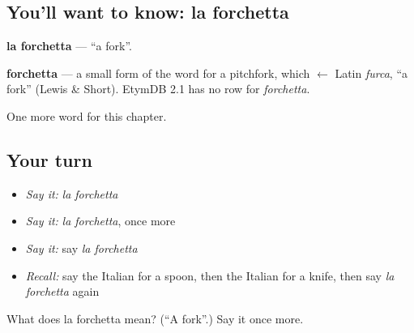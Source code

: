 \subsection*{You'll want to know: la forchetta}
\textbf{la forchetta} — \textquotedblleft{}a fork\textquotedblright{}.

\begin{cousinweb}
\textbf{forchetta} — a small form of the word for a pitchfork, which $\leftarrow$ Latin \emph{furca}, \textquotedblleft{}a fork\textquotedblright{} (Lewis \& Short). EtymDB 2.1 has no row for \emph{forchetta}.
\end{cousinweb}

\begin{grammarlens}[title={What you've built}]
One more word for this chapter.
\end{grammarlens}

\subsection*{Your turn}
\begin{itemize}
\raggedright
  \item \emph{Say it:} \emph{la forchetta}
  \item \emph{Say it:} \emph{la forchetta}, once more
  \item \emph{Say it:} say \emph{la forchetta}
  \item \emph{Recall:} say the Italian for a spoon, then the Italian for a knife, then say \emph{la forchetta} again
\end{itemize}

\begin{tcolorbox}[breakable,colback=teal!4,colframe=teal!35!black,title={Before you move on}]
What does la forchetta mean? (\textquotedblleft{}A fork\textquotedblright{}.) Say it once more.
\end{tcolorbox}

